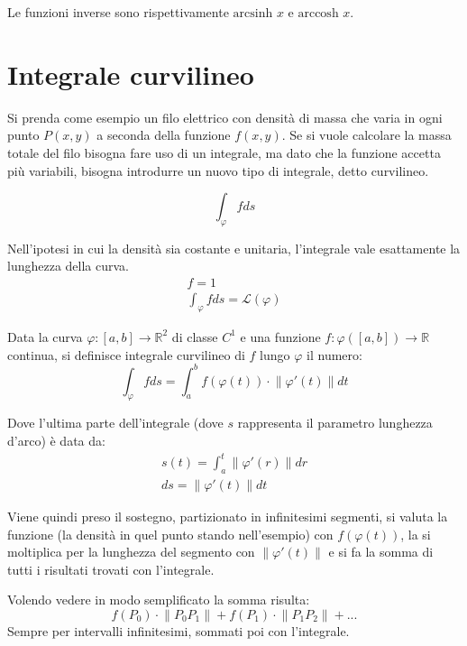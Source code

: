Le funzioni inverse sono rispettivamente $\text{arcsinh } x$ e $\text{arccosh }x$.


\section{Integrale curvilineo}
Si prenda come esempio un filo elettrico con densità di massa che varia in ogni punto $P(x, y)$ a seconda della funzione $f(x, y)$. Se si vuole calcolare la massa totale del filo bisogna fare uso di un integrale, ma dato che la funzione accetta più variabili, bisogna introdurre un nuovo tipo di integrale, detto curvilineo.

\begin{equation}
	\int_\varphi f ds
\end{equation}

Nell'ipotesi in cui la densità sia costante e unitaria, l'integrale vale esattamente la lunghezza della curva.
\begin{gather}
	f=1 \\
	\int_\varphi f ds=\mathcal{L}(\varphi)
\end{gather}

\begin{definition}
	Data la curva $\varphi:[a, b]\rightarrow\mathbb{R}^2$ di classe $C^1$ e una funzione $f:\varphi([a, b])\rightarrow\mathbb{R}$ continua, si definisce integrale curvilineo di $f$ lungo $\varphi$ il numero:
	\begin{equation}
		\int_\varphi f ds=\int_a^b f(\varphi(t))\cdot \left\|\varphi'(t)\right\|dt
	\end{equation}
	
	Dove l'ultima parte dell'integrale (dove $s$ rappresenta il parametro lunghezza d'arco) è data da:
	\begin{gather}
		s(t)=\int_a^t \left\|\varphi'(r)\right\|dr \\
		ds=\left\|\varphi'(t)\right\| dt
	\end{gather}
\end{definition}

Viene quindi preso il sostegno, partizionato in infinitesimi segmenti, si valuta la funzione (la densità in quel punto stando nell'esempio) con $f(\varphi(t))$, la si moltiplica per la lunghezza del segmento con $\left\|\varphi'(t)\right\|$ e si fa la somma di tutti i risultati trovati con l'integrale.

Volendo vedere in modo semplificato la somma risulta:
\begin{equation}
	f(P_0)\cdot \left\|P_0P_1\right\|+f(P_1)\cdot \left\|P_1P_2\right\|+...
\end{equation}
Sempre per intervalli infinitesimi, sommati poi con l'integrale.

